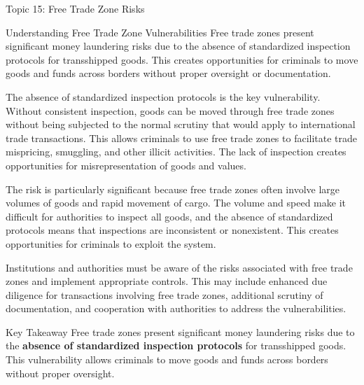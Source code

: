\documentclass[5pt]{beamer}
\begin{document}
	\begin{frame}{Topic 15: Free Trade Zone Risks}
		\begin{block}{\tiny Understanding Free Trade Zone Vulnerabilities}
			\tiny Free trade zones present significant money laundering risks due to the absence of standardized inspection protocols for transshipped goods. This creates opportunities for criminals to move goods and funds across borders without proper oversight or documentation.
			
			The absence of standardized inspection protocols is the key vulnerability. Without consistent inspection, goods can be moved through free trade zones without being subjected to the normal scrutiny that would apply to international trade transactions. This allows criminals to use free trade zones to facilitate trade mispricing, smuggling, and other illicit activities. The lack of inspection creates opportunities for misrepresentation of goods and values.
			
			The risk is particularly significant because free trade zones often involve large volumes of goods and rapid movement of cargo. The volume and speed make it difficult for authorities to inspect all goods, and the absence of standardized protocols means that inspections are inconsistent or nonexistent. This creates opportunities for criminals to exploit the system.
			
			Institutions and authorities must be aware of the risks associated with free trade zones and implement appropriate controls. This may include enhanced due diligence for transactions involving free trade zones, additional scrutiny of documentation, and cooperation with authorities to address the vulnerabilities.
		\end{block}
		
		\begin{alertblock}{Key Takeaway}
			\tiny Free trade zones present significant money laundering risks due to the \textbf{absence of standardized inspection protocols} for transshipped goods. This vulnerability allows criminals to move goods and funds across borders without proper oversight.
		\end{alertblock}
	\end{frame}
	
\end{document}
